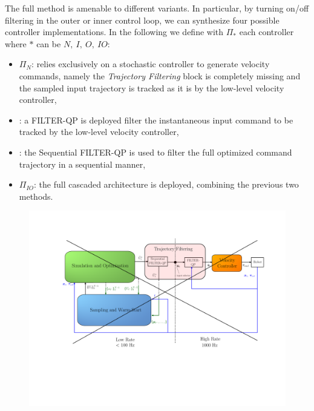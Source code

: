 The full method is amenable to different variants. In particular, by turning on/off filtering in the outer or inner control loop, we can synthesize four possible controller implementations. In the following we define with $\Pi_{*}$ each controller where $*$ can be $N,\ I,\ O,\ IO$:
\begin{itemize}
    \item $\Pi_{N}$: relies exclusively on a stochastic controller to generate velocity commands, namely the \textit{Trajectory Filtering} block is completely missing and the sampled input trajectory is tracked as it is by the low-level velocity controller,
    \item \ctrlInner: a FILTER-QP is deployed filter the instantaneous input command to be tracked by the low-level velocity controller,
    \item \ctrlOuter:  the Sequential FILTER-QP is used  to filter the full optimized command trajectory in a sequential manner,
    \item $\Pi_{IO}$: the full cascaded architecture is deployed, combining the previous two methods.
\end{itemize}

\ifreview
\begin{figure}[t!]
\centering
\vspace{-0.5cm}
\includegraphics[width=0.95\columnwidth] {figures/schemes/receding_horizon_new_paper_sout.pdf}
\end{figure}
\fi

